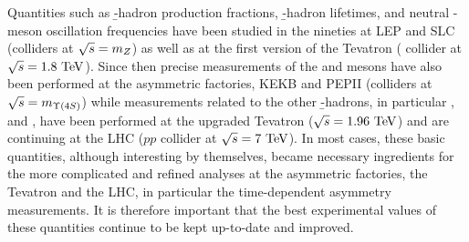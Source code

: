 %
%
%
%

%







Quantities such as \b-hadron production fractions, \b-hadron lifetimes, 
and neutral \B-meson oscillation frequencies have been studied
in the nineties at LEP and SLC %
(\ee colliders at $\sqrt{s}=m_{Z}$) 
as well as at the 
first version of the Tevatron
( collider at $\sqrt{s}=1.8~\rm TeV$). 
Since then 
precise measurements of the \Bd and \Bu mesons
have also been performed at the 
asymmetric \B factories, KEKB and PEPII
(\ee colliders at $\sqrt{s}=m_{\Upsilon(4S)}$) while measurements related 
to the other \b-hadrons, in particular \Bs, \Bc and \Lb, 
have been performed at the upgraded Tevatron ($\sqrt{s}=1.96~\rm TeV$)
and are continuing at the LHC ($pp$ collider at $\sqrt{s}=7~\rm TeV$).
In most cases, these basic quantities, although interesting by themselves,
became necessary ingredients for the more complicated and 
refined analyses at the asymmetric \B factories, 
the Tevatron and the LHC,
in particular the time-dependent \CP asymmetry measurements.
It is therefore important that the best experimental
values of these quantities continue to be kept up-to-date and improved. 

